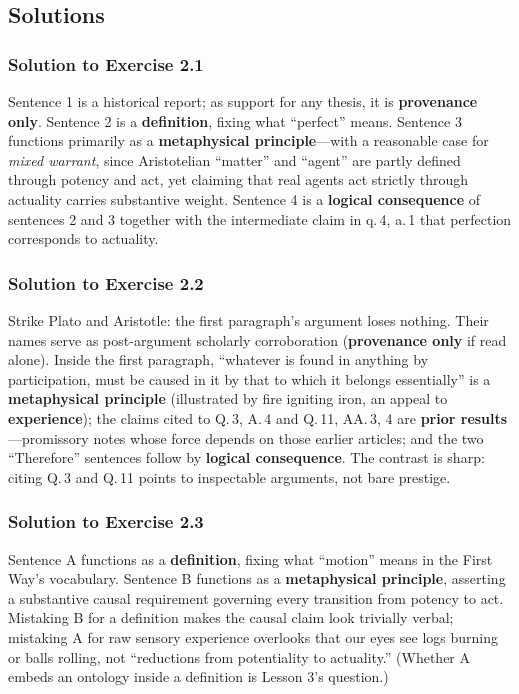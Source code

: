 \subsection{Solutions}

\subsubsection*{Solution to Exercise 2.1}
Sentence 1 is a historical report; as support for any thesis, it is \textbf{provenance only}. Sentence 2 is a \textbf{definition}, fixing what ``perfect'' means. Sentence 3 functions primarily as a \textbf{metaphysical principle}---with a reasonable case for \emph{mixed warrant}, since Aristotelian ``matter'' and ``agent'' are partly defined through potency and act, yet claiming that real agents act strictly through actuality carries substantive weight. Sentence 4 is a \textbf{logical consequence} of sentences 2 and 3 together with the intermediate claim in q.\,4, a.\,1 that perfection corresponds to actuality.

\subsubsection*{Solution to Exercise 2.2}
Strike Plato and Aristotle: the first paragraph's argument loses nothing. Their names serve as post-argument scholarly corroboration (\textbf{provenance only} if read alone). Inside the first paragraph, ``whatever is found in anything by participation, must be caused in it by that to which it belongs essentially'' is a \textbf{metaphysical principle} (illustrated by fire igniting iron, an appeal to \textbf{experience}); the claims cited to Q.\,3, A.\,4 and Q.\,11, AA.\,3, 4 are \textbf{prior results}---promissory notes whose force depends on those earlier articles; and the two ``Therefore'' sentences follow by \textbf{logical consequence}. The contrast is sharp: citing Q.\,3 and Q.\,11 points to inspectable arguments, not bare prestige.

\subsubsection*{Solution to Exercise 2.3}
Sentence A functions as a \textbf{definition}, fixing what ``motion'' means in the First Way's vocabulary. Sentence B functions as a \textbf{metaphysical principle}, asserting a substantive causal requirement governing every transition from potency to act. Mistaking B for a definition makes the causal claim look trivially verbal; mistaking A for raw sensory experience overlooks that our eyes see logs burning or balls rolling, not ``reductions from potentiality to actuality.'' (Whether A embeds an ontology inside a definition is Lesson 3's question.)

